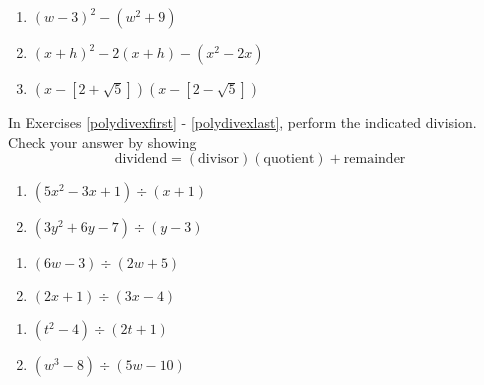 \documentclass{ximera}
\begin{document}
\begin{multicols}{3}
\begin{enumerate}
\setcounter{enumi}{\value{HW}}


\item $(w-3)^2 - (w^2 + 9)$
\item $(x+h)^2 - 2(x+h) - (x^2 - 2x)$
\item $(x-[2+\sqrt{5}])(x-[2-\sqrt{5}])$ \label{polyarithexlast}

\setcounter{HW}{\value{enumi}}
\end{enumerate}
\end{multicols}

In Exercises \ref{polydivexfirst} - \ref{polydivexlast}, perform the indicated division.  Check your answer by showing \[\text{dividend} = (\text{divisor})( \text{quotient}) + \text{remainder}\]

\begin{multicols}{2}
\begin{enumerate}
\setcounter{enumi}{\value{HW}}

\item $(5x^2 - 3x + 1) \div (x + 1)$ \label{polydivexfirst}
\item $(3y^2 + 6y - 7) \div (y-3)$

\setcounter{HW}{\value{enumi}}
\end{enumerate}
\end{multicols}


\begin{multicols}{2}
\begin{enumerate}
\setcounter{enumi}{\value{HW}}

\item $(6w - 3) \div (2w+5)$
\item $(2x+1) \div (3x-4)$


\setcounter{HW}{\value{enumi}}
\end{enumerate}
\end{multicols}


\begin{multicols}{2}
\begin{enumerate}
\setcounter{enumi}{\value{HW}}

\item $(t^2 - 4) \div (2t + 1)$

\item $(w^3 - 8) \div (5w-10)$

\setcounter{HW}{\value{enumi}}
\end{enumerate}
\end{multicols}
\end{document}
